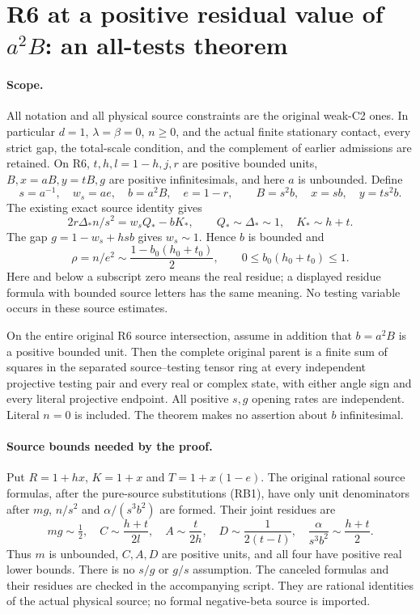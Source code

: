 \section{R6 at a positive residual value of $a^2B$: an all-tests theorem}
\label{sec:r6-b-unit}

\paragraph{Scope.}
All notation and all physical source constraints are the original weak-C2
ones. In particular $d=1$, $\lambda=\beta=0$, $n\geq0$, and the actual
finite stationary contact, every strict gap, the total-scale condition,
and the complement of earlier admissions are retained. On R6,
$t,h,l=1-h,j,r$ are positive bounded units, $B,x=aB,y=tB,g$ are
positive infinitesimals, and here $a$ is unbounded. Define
\[
 s=a^{-1},\quad w_s=ae,\quad b=a^2B,\quad e=1-r,
 \qquad B=s^2b,\quad x=sb,\quad y=ts^2b.
 \tag{RB1}
\]
The existing exact source identity gives
\[
 2r\Delta_*n/s^2=w_sQ_*-bK_*,\qquad
 Q_*\sim\Delta_*\sim1,\quad K_*\sim h+t.
 \tag{RB2}
\]
The gap $g=1-w_s+hsb$ gives $w_s\sim1$. Hence $b$ is bounded and
\[
 \rho=n/e^2\sim\frac{1-b_0(h_0+t_0)}2,\qquad
 0\leq b_0(h_0+t_0)\leq1.                         \tag{RB3}
\]
Here and below a subscript zero means the real residue; a displayed
residue formula with bounded source letters has the same meaning.
No testing variable occurs in these source estimates.

\begin{theorem}
On the entire original R6 source intersection, assume in addition that
$b=a^2B$ is a positive bounded unit. Then the complete original parent
is a finite sum of squares in the separated source--testing tensor ring
at every independent projective testing pair and every real or complex
state, with either angle sign and every literal projective endpoint.
All positive $s,g$ opening rates are independent. Literal $n=0$ is
included. The theorem makes no assertion about $b$ infinitesimal.
\end{theorem}

\paragraph{Source bounds needed by the proof.}
Put $R=1+hx$, $K=1+x$ and $T=1+x(1-e)$. The original rational source
formulas, after the pure-source substitutions (RB1), have only unit
denominators after $mg$, $n/s^2$ and $\alpha/(s^3b^2)$ are formed.
Their joint residues are
\[
 mg\sim\tfrac12,\quad
 C\sim\frac{h+t}{2l},\quad A\sim\frac t{2h},\quad
 D\sim\frac1{2(t-l)},\quad
 \frac\alpha{s^3b^2}\sim\frac{h+t}2.               \tag{RB4}
\]
Thus $m$ is unbounded, $C,A,D$ are positive units, and all four have
positive real lower bounds. There is no $s/g$ or $g/s$ assumption.
The canceled formulas and their residues are checked in the accompanying
script. They are rational identities of the actual physical source;
no formal negative-beta source is imported.


